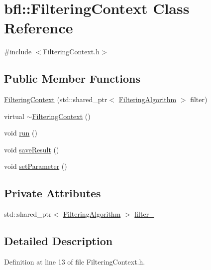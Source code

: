 \hypertarget{classbfl_1_1FilteringContext}{}\section{bfl\+:\+:Filtering\+Context Class Reference}
\label{classbfl_1_1FilteringContext}


{\ttfamily \#include $<$Filtering\+Context.\+h$>$}

\subsection*{Public Member Functions}
\begin{DoxyCompactItemize}
\item 
\mbox{\hyperlink{classbfl_1_1FilteringContext_a55257440dbb1d21d10cd2a114333305c}{Filtering\+Context}} (std\+::shared\+\_\+ptr$<$ \mbox{\hyperlink{classbfl_1_1FilteringAlgorithm}{Filtering\+Algorithm}} $>$ filter)
\item 
virtual \mbox{\hyperlink{classbfl_1_1FilteringContext_a205a6c269a11dd7a2425753336b4416d}{$\sim$\+Filtering\+Context}} ()
\item 
void \mbox{\hyperlink{classbfl_1_1FilteringContext_ae231d933d38221f3505c7dcaef4d853a}{run}} ()
\item 
void \mbox{\hyperlink{classbfl_1_1FilteringContext_a77f5148a9365e4257554b1594cb45c8e}{save\+Result}} ()
\item 
void \mbox{\hyperlink{classbfl_1_1FilteringContext_a21b4c61a64a36aff518200aac5031d45}{set\+Parameter}} ()
\end{DoxyCompactItemize}
\subsection*{Private Attributes}
\begin{DoxyCompactItemize}
\item 
std\+::shared\+\_\+ptr$<$ \mbox{\hyperlink{classbfl_1_1FilteringAlgorithm}{Filtering\+Algorithm}} $>$ \mbox{\hyperlink{classbfl_1_1FilteringContext_a143316c648445254fdd512f317a81d5e}{filter\+\_\+}}
\end{DoxyCompactItemize}


\subsection{Detailed Description}


Definition at line 13 of file Filtering\+Context.\+h.



